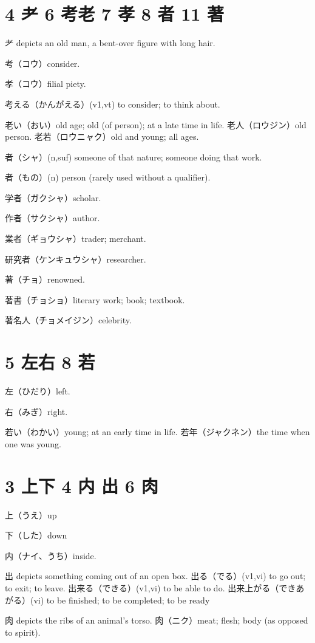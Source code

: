 \section{4 耂 6 考老 7 孝 8 者 11 著}

耂 depicts an old man, a bent-over figure with long hair.

考（コウ）consider.

孝（コウ）filial piety.

考える（かんがえる）(v1,vt) to consider; to think about.

老い（おい）old age; old (of person); at a late time in life.
老人（ロウジン）old person.
老若（ロウニャク）old and young; all ages.

者（シャ）(n,suf) someone of that nature; someone doing that work.

者（もの）(n) person (rarely used without a qualifier).

学者（ガクシャ）scholar.

作者（サクシャ）author.

業者（ギョウシャ）trader; merchant.

研究者（ケンキュウシャ）researcher.

著（チョ）renowned.

著書（チョショ）literary work; book; textbook.

著名人（チョメイジン）celebrity.

\section{5 左右 8 若}

左（ひだり）left.

右（みぎ）right.

若い（わかい）young; at an early time in life.
若年（ジャクネン）the time when one was young.

\section{3 上下 4 内 出 6 肉}

上（うえ）up

下（した）down

内（ナイ、うち）inside.

出 depicts something coming out of an open box.
出る（でる）(v1,vi) to go out; to exit; to leave.
出来る（できる）(v1,vi) to be able to do.
出来上がる（できあがる）(vi) to be finished; to be completed; to be ready

肉 depicts the ribs of an animal's torso.
肉（ニク）meat; flesh; body (as opposed to spirit).

